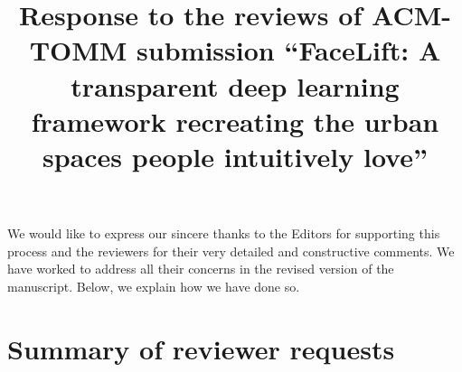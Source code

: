 \documentclass{paper}
\newenvironment{myquoteOrange}
{\definecolor{shadecolor}{rgb}{1,0.9,0.83} \begin{shaded*} \sf \em}
{\em\end{shaded*}}
\begin{document}


\title{Response to the reviews of ACM-TOMM submission ``FaceLift: A transparent deep learning framework recreating the urban spaces people intuitively love''}
\maketitle

We would like to express our sincere thanks to the Editors for supporting this process and the reviewers for their very detailed and constructive comments. We have worked to address all their concerns in the revised version of the manuscript. Below, we explain how we have done so.


\section*{Summary of reviewer requests}
\end{document}
